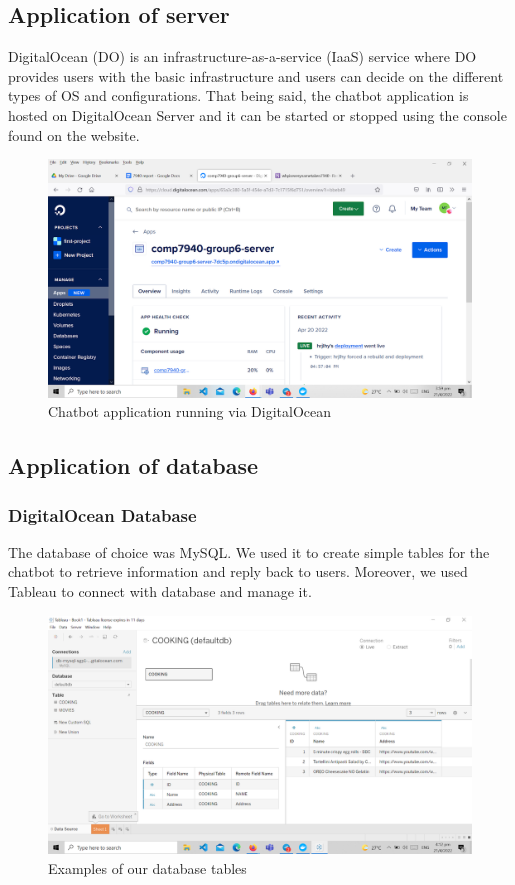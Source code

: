 \documentclass[conference]{IEEEtran}
\begin{document}
\subsection{Application of server}
DigitalOcean (DO) is an infrastructure-as-a-service (IaaS) service where DO provides users with the basic infrastructure and users can decide on the different types of OS and configurations. That being said, the chatbot application is hosted on DigitalOcean Server and it can be started or stopped using the console found on the website. 
\begin{figure}[h]
\includegraphics[scale=0.155]{2} 
\caption{Chatbot application running via DigitalOcean}
\end{figure}

\subsection{Application of database}
\subsubsection*{DigitalOcean Database}
The database of choice was MySQL. We used it to create simple tables for the chatbot to retrieve information and reply back to users. Moreover, we used Tableau to connect with database and manage it.
\begin{figure}[h]
\includegraphics[scale=0.155]{6} 
\caption{Examples of our database tables}
\end{figure}
\end{document}
